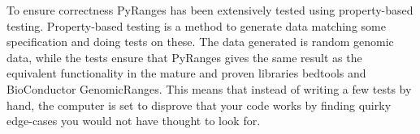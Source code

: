 \documentclass[10pt,letterpaper]{article}
\begin{document}
To ensure correctness PyRanges has been extensively tested using property-based
testing. Property-based testing is a method to generate data matching some
specification and doing tests on these. The data generated is random genomic
data, while the tests ensure that PyRanges gives the same result as the
equivalent functionality in the mature and proven libraries
bedtools\cite{doi:10.1093/bioinformatics/btq033} and BioConductor GenomicRanges.
This means that instead of writing a few tests by hand, the computer is set to
disprove that your code works by finding quirky edge-cases you would not have
thought to look for.






\end{document}
